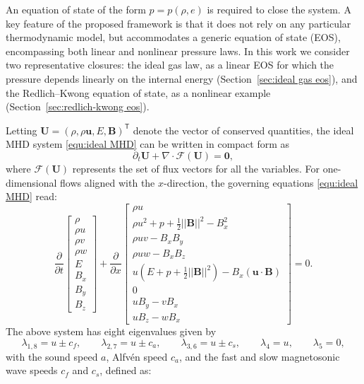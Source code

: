 \documentclass[a4paper,fleqn]{cas-sc}
\theoremstyle{definition}
\theoremstyle{remark}
\begin{document}
An equation of state of the form $p = p(\rho, e)$ is required to close the 
system. A key feature of the proposed framework is that it does not rely on any particular 
thermodynamic model, but accommodates a generic equation of state (EOS), 
encompassing both linear and nonlinear pressure laws. In this work we consider two 
representative closures: the ideal gas law, as a linear EOS for which the pressure 
depends linearly on the internal energy (Section~\ref{sec:ideal gas eos}), and the 
Redlich--Kwong equation of state, as a nonlinear example (Section~\ref{sec:redlich-kwong eos}).

Letting $\mathbf{U} = (\rho, \rho\mathbf{u}, E, \mathbf{B})^{\mathsf T}$ denote 
the vector of conserved quantities, the  ideal MHD system \eqref{equ:ideal MHD} can be 
written in compact form as
\begin{equation}
\label{equ:compact_MHD}
\partial_t \mathbf{U} + \nabla \cdot \boldsymbol{\mathcal{F}}(\mathbf{U}) = \mathbf{0},
\end{equation}
where $\boldsymbol{\mathcal{F}}(\mathbf{U})$ 
represents the set of flux vectors for all the variables. For one-dimensional flows aligned with the $x$-direction, the governing equations \eqref{equ:ideal MHD} read:
\begin{equation}
\label{equ:1DMHD}
\frac{\partial}{\partial t}
\begin{bmatrix}
\rho \\
\rho u \\
\rho v \\
\rho w \\
E \\
B_x \\
B_y \\
B_z
\end{bmatrix}
+
\frac{\partial}{\partial x}
\begin{bmatrix}
\rho u \\
\rho u^2 + p + \frac{1}{2}||\mathbf{B}||^2 - B_x^2 \\
\rho u v - B_x B_y \\
\rho u w - B_x B_z \\
u (E + p + \frac{1}{2}||\mathbf{B}||^2) - B_x (\mathbf{u}\cdot\mathbf{B}) \\
0 \\
u B_y - v B_x \\
u B_z - w B_x
\end{bmatrix}
= 0 .
\end{equation}
The above system has eight eigenvalues given by
\begin{equation}
\lambda_{1,8} = u \pm c_f, \qquad
\lambda_{2,7} = u \pm c_a, \qquad
\lambda_{3,6} = u \pm c_s, \qquad
\lambda_4 = u, \qquad
\lambda_5 = 0 ,
\end{equation}
with the sound speed $a$, Alfvén speed $c_a$, and the fast and slow magnetosonic wave speeds
$c_f$ and $c_s$, defined as:
\end{document}
